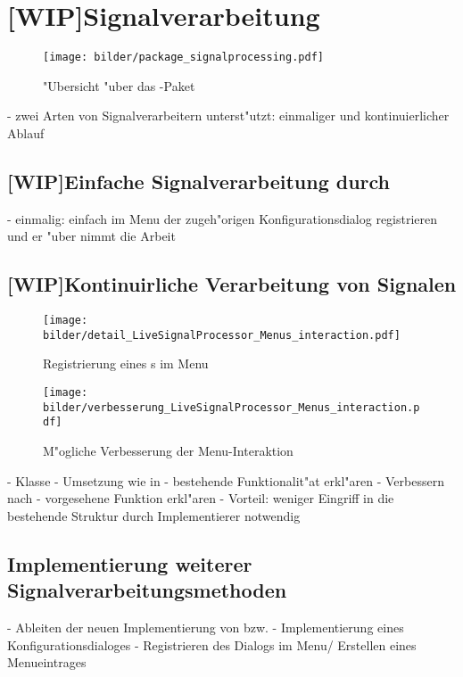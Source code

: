 \section{[WIP]Signalverarbeitung}



\begin{figure}[htb]
\centering
\texttt{[image: bilder/package\_signalprocessing.pdf]}
\caption{"Ubersicht "uber das -Paket}
\label{pic:package_signalprocessing}
\end{figure}

- zwei Arten von Signalverarbeitern unterst"utzt: einmaliger und kontinuierlicher Ablauf

\subsection{[WIP]Einfache Signalverarbeitung durch }

- einmalig: einfach im Menu der zugeh"origen Konfigurationsdialog registrieren und er "uber nimmt die Arbeit

\subsection{[WIP]Kontinuirliche Verarbeitung von Signalen}

\begin{figure}[tbh]
\centering
\texttt{[image: bilder/detail\_LiveSignalProcessor\_Menus\_interaction.pdf]}
\caption{Registrierung eines s im Menu}
\label{pic:interaction_menu_lsp}
\end{figure}
\begin{figure}[tbh]
\centering
\texttt{[image: bilder/verbesserung\_LiveSignalProcessor\_Menus\_interaction.pdf]}
\caption{M"ogliche Verbesserung der Menu-Interaktion}
\label{pic:interaction_menu_lsp_improved}
\end{figure}

- Klasse 
- Umsetzung wie in 
- bestehende Funktionalit"at erkl"aren
- Verbessern nach 
- vorgesehene Funktion erkl"aren
- Vorteil: weniger Eingriff in die bestehende Struktur durch Implementierer notwendig

\subsection{Implementierung weiterer Signalverarbeitungsmethoden}

- Ableiten der neuen Implementierung von  bzw. 
- Implementierung eines Konfigurationsdialoges
- Registrieren des Dialogs im Menu/ Erstellen eines Menueintrages

